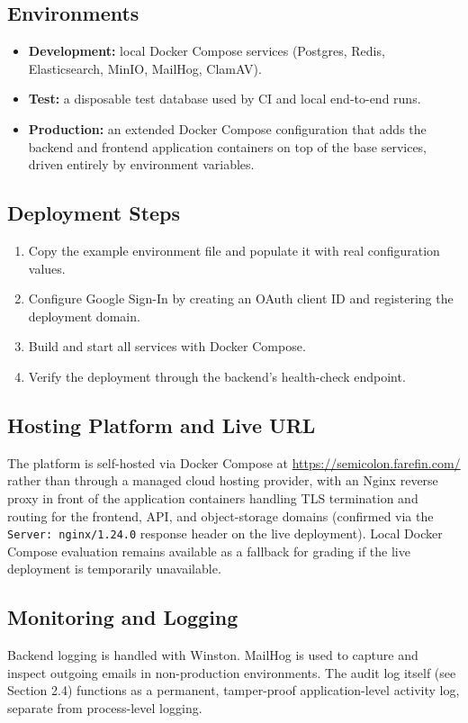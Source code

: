 \documentclass[12pt]{article}
\begin{document}
\subsection{Environments}
\begin{itemize}[leftmargin=1.4em]
\item \textbf{Development:} local Docker Compose services (Postgres, Redis, Elasticsearch, MinIO, MailHog, ClamAV).
\item \textbf{Test:} a disposable test database used by CI and local end-to-end runs.
\item \textbf{Production:} an extended Docker Compose configuration that adds the backend and frontend application containers on top of the base services, driven entirely by environment variables.
\end{itemize}

\subsection{Deployment Steps}
\begin{enumerate}[leftmargin=1.6em]
\item Copy the example environment file and populate it with real configuration values.
\item Configure Google Sign-In by creating an OAuth client ID and registering the deployment domain.
\item Build and start all services with Docker Compose.
\item Verify the deployment through the backend's health-check endpoint.
\end{enumerate}

\subsection{Hosting Platform and Live URL}
The platform is self-hosted via Docker Compose at \url{https://semicolon.farefin.com/} rather than through a managed cloud hosting provider, with an Nginx reverse proxy in front of the application containers handling TLS termination and routing for the frontend, API, and object-storage domains (confirmed via the \texttt{Server: nginx/1.24.0} response header on the live deployment). Local Docker Compose evaluation remains available as a fallback for grading if the live deployment is temporarily unavailable.

\subsection{Monitoring and Logging}
Backend logging is handled with Winston. MailHog is used to capture and inspect outgoing emails in non-production environments. The audit log itself (see Section 2.4) functions as a permanent, tamper-proof application-level activity log, separate from process-level logging.
\end{document}
